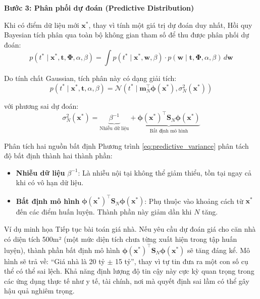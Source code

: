 \textbf{Bước 3: Phân phối dự đoán (Predictive Distribution)}

Khi có điểm dữ liệu mới $\mathbf{x}^*$, thay vì tính một giá trị dự đoán duy nhất, Hồi quy Bayesian tích phân qua toàn bộ không gian tham số để thu được phân phối dự đoán:
\begin{equation}
p(t^* \mid \mathbf{x}^*, \mathbf{t}, \mathbf{\Phi}, \alpha, \beta) = \int p(t^* \mid \mathbf{x}^*, \mathbf{w}, \beta) \cdot p(\mathbf{w} \mid \mathbf{t}, \mathbf{\Phi}, \alpha, \beta) \, d\mathbf{w}
\end{equation}

Do tính chất Gaussian, tích phân này có dạng giải tích:
\begin{equation}
p(t^* \mid \mathbf{x}^*, \mathbf{t}, \alpha, \beta) = \mathcal{N}\left(t^* \mid \mathbf{m}_N^{\top}\boldsymbol{\phi}(\mathbf{x}^*), \sigma_N^2(\mathbf{x}^*)\right)
\label{eq:predictive_dist}
\end{equation}

với phương sai dự đoán:
\begin{equation}
\sigma_N^2(\mathbf{x}^*) = \underbrace{\beta^{-1}}_{\text{Nhiễu dữ liệu}} + \underbrace{\boldsymbol{\phi}(\mathbf{x}^*)^{\top}\mathbf{S}_N\boldsymbol{\phi}(\mathbf{x}^*)}_{\text{Bất định mô hình}}
\label{eq:predictive_variance}
\end{equation}

\begin{notebox}{Phân tích hai nguồn bất định}
Phương trình \eqref{eq:predictive_variance} phân tách độ bất định thành hai thành phần:
\begin{itemize}
    \item \textbf{Nhiễu dữ liệu} $\beta^{-1}$: Là nhiễu nội tại không thể giảm thiểu, tồn tại ngay cả khi có vô hạn dữ liệu.
    \item \textbf{Bất định mô hình} $\boldsymbol{\phi}(\mathbf{x}^*)^{\top}\mathbf{S}_N\boldsymbol{\phi}(\mathbf{x}^*)$: Phụ thuộc vào khoảng cách từ $\mathbf{x}^*$ đến các điểm huấn luyện. Thành phần này giảm dần khi $N$ tăng.
\end{itemize}
\end{notebox}

\begin{examplebox} {Ví dụ minh họa}
    Tiếp tục bài toán giá nhà. Nếu yêu cầu dự đoán giá cho căn nhà có diện tích 500m² (một mức diện tích chưa từng xuất hiện trong tập huấn luyện), thành phần bất định mô hình $\boldsymbol{\phi}(\mathbf{x}^*)^{\top}\mathbf{S}_N\boldsymbol{\phi}(\mathbf{x}^*)$ sẽ tăng đáng kể. Mô hình sẽ trả về: ``Giá nhà là 20 tỷ $\pm$ 15 tỷ'', thay vì tự tin đưa ra một con số cụ thể có thể sai lệch. Khả năng định lượng độ tin cậy này cực kỳ quan trọng trong các ứng dụng thực tế như y tế, tài chính, nơi mà quyết định sai lầm có thể gây hậu quả nghiêm trọng.
\end{examplebox}

